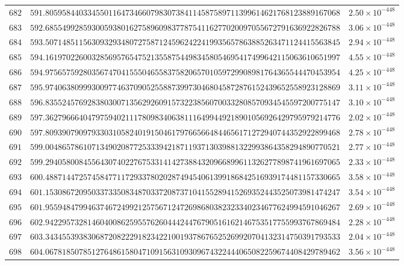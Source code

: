 \documentclass[12pt,reqno]{amsart}
\theoremstyle{remark}
\begin{document}
\begin{longtable}{clc}
$682$ & $591.8059584403345501164734660798307384114587589711399614621768123889167068$ & $2.50\times 10^{-448}$ \\
$683$ & $592.6855499285930059380162758960983778754116277020097055672791636922826788$ & $3.06\times 10^{-448}$ \\
$684$ & $593.5071485115630932934807275871245962422419935657863885263471124415563845$ & $2.94\times 10^{-448}$ \\
$685$ & $594.1619702260032856957654752135587544983458054695417499642115063610651997$ & $4.55\times 10^{-448}$ \\
$686$ & $594.9756575928035674704155504655837582065701059729908981764365544470453954$ & $4.25\times 10^{-448}$ \\
$687$ & $595.9740638099930097746370905255887399730468045872876152439652558923128869$ & $3.11\times 10^{-448}$ \\
$688$ & $596.8355245769283803007135629260915732238560700332808570934545597200775147$ & $3.10\times 10^{-448}$ \\
$689$ & $597.3627966640479759402111780983406381116499449218901056926429795979214776$ & $2.02\times 10^{-448}$ \\
$690$ & $597.8093907909793303105824019150461797665664844656171272940744352922899468$ & $2.78\times 10^{-448}$ \\
$691$ & $599.0048657861071349020877253339421871193713039881322993864358294890770521$ & $2.77\times 10^{-448}$ \\
$692$ & $599.2940580084556430740227675331414273884320966899611326277898741961697065$ & $2.33\times 10^{-448}$ \\
$693$ & $600.4887144725745847711729337802028749454061399186842516939174481157330665$ & $3.58\times 10^{-448}$ \\
$694$ & $601.1530867209503373350834870337208737104155289415269352443525073981474247$ & $3.54\times 10^{-448}$ \\
$695$ & $601.9559484799463746724992125756712472698680382323340234677624994591046267$ & $2.69\times 10^{-448}$ \\
$696$ & $602.9422957328146040086259557626044424476790516162146753517755993767869484$ & $2.28\times 10^{-448}$ \\
$697$ & $603.3434553938306872082229182342210019378676525269920704132314750391793533$ & $2.04\times 10^{-448}$ \\
$698$ & $604.0678185078512764861580471091563109309674322444065082259674408429789462$ & $3.56\times 10^{-448}$ \\

\end{longtable}
\end{document}
